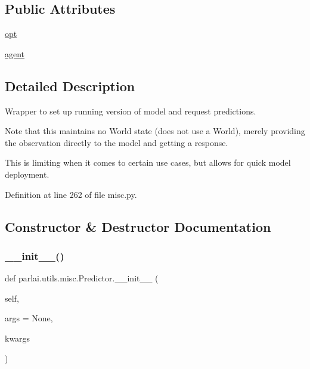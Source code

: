 \subsection*{Public Attributes}
\begin{DoxyCompactItemize}
\item 
\hyperlink{classparlai_1_1utils_1_1misc_1_1Predictor_a608b3d7f6722389f3a7eeed0ec5772b7}{opt}
\item 
\hyperlink{classparlai_1_1utils_1_1misc_1_1Predictor_a0ea35fd562c6edaa6affd03006f1bd08}{agent}
\end{DoxyCompactItemize}


\subsection{Detailed Description}
\begin{DoxyVerb}Wrapper to set up running version of model and request predictions.

Note that this maintains no World state (does not use a World), merely
providing the observation directly to the model and getting a response.

This is limiting when it comes to certain use cases, but allows for quick
model deployment.
\end{DoxyVerb}
 

Definition at line 262 of file misc.\+py.



\subsection{Constructor \& Destructor Documentation}
\mbox{\label{classparlai_1_1utils_1_1misc_1_1Predictor_a40aaf55870ba3c02fc2bff2ef5d2a9b7}} 
\subsubsection{\texorpdfstring{\+\_\+\+\_\+init\+\_\+\+\_\+()}{\_\_init\_\_()}}
{\footnotesize\ttfamily def parlai.\+utils.\+misc.\+Predictor.\+\_\+\+\_\+init\+\_\+\+\_\+ (\begin{DoxyParamCaption}\item[{}]{self,  }\item[{}]{args = {\ttfamily None},  }\item[{}]{kwargs }\end{DoxyParamCaption})}

